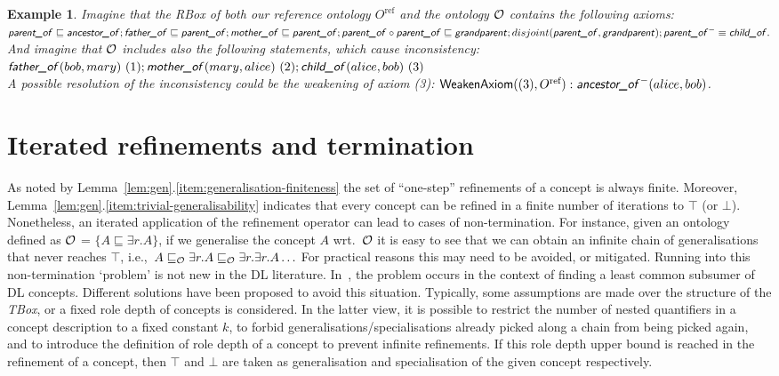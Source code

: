 \documentclass[
]{ceurart}
\newtheorem{example}{Example}
\begin{document}
\begin{example}%
Imagine that the \emph{RBox} of both our reference ontology $O^\text{ref}$ and the ontology $\mathcal{O}$ contains the following axioms:
\noindent
$\textsf{\textsl{parent\_of}} \sqsubseteq \textsf{\textsl{ancestor\_of}} ; \textsf{\textsl{father\_of}} \sqsubseteq \textsf{\textsl{parent\_of}}; \textsf{\textsl{mother\_of}} \sqsubseteq \textsf{\textsl{parent\_of}}; 
\textsf{\textsl{parent\_of}} \circ \textsf{\textsl{parent\_of}} \sqsubseteq \textsf{\textsl{grandparent}};\\
disjoint(\textsf{\textsl{parent\_of}}, \textsf{\textsl{grandparent}}); \textsf{\textsl{parent\_of}}^- \equiv \textsf{\textsl{child\_of}}. $\\
\noindent
And imagine that $\mathcal{O}$ includes also the following statements, which cause inconsistency:
$
\textsf{\textsl{father\_of}}(bob, mary)~(1) ; \textsf{\textsl{mother\_of}}(mary, alice)~(2) ; \textsf{\textsl{child\_of}}(alice, bob)~(3)$\\
%
\noindent
A possible resolution of the inconsistency could be the weakening of axiom (3):
\noindent 
$\textsf{WeakenAxiom}((3), O^\text{ref}): \textsf{\textsl{ancestor\_of}}^-(alice, bob)$.
\end{example}


\section{Iterated refinements and termination}
As noted by Lemma~\ref{lem:gen}.\ref{item:generalisation-finiteness} the set of ``one-step'' refinements of a concept is always finite. Moreover, Lemma~\ref{lem:gen}.\ref{item:trivial-generalisability} indicates that every concept can be refined in a finite number of iterations to $\top$ (or $\bot$).
%
Nonetheless, an iterated application of the refinement operator can lead to cases of non-termination. For instance, given an ontology defined as $\mathcal{O}$ = $\{A \sqsubseteq \exists r. A\}$, if we generalise the concept $A$ wrt.\ $\mathcal{O}$ it is easy to see that we can obtain an infinite chain of generalisations that never reaches $\top$, i.e.,~$A \sqsubseteq_\mathcal{O} \exists r. A \sqsubseteq_\mathcal{O} \exists r. \exists r. A \ldots$ For practical reasons this may need to be avoided, or mitigated. 
Running into this non-termination `problem' is not new in the DL literature. In~\cite{Baader2006}, the problem occurs in the context of finding a least common subsumer of DL concepts. Different solutions have been proposed to avoid this situation. Typically, some assumptions are made over the structure of the \emph{TBox}, or a fixed role depth of concepts is considered. In the latter view, it is possible to restrict the number of nested quantifiers in a concept description to a fixed constant $k$, to forbid generalisations/specialisations already picked along a chain from being picked again, and to introduce the definition of role depth of a concept to prevent infinite refinements. If this role depth upper bound is reached in the refinement of a concept, then $\top$ and $\bot$ are taken as generalisation and specialisation of the given concept respectively.
\end{document}
